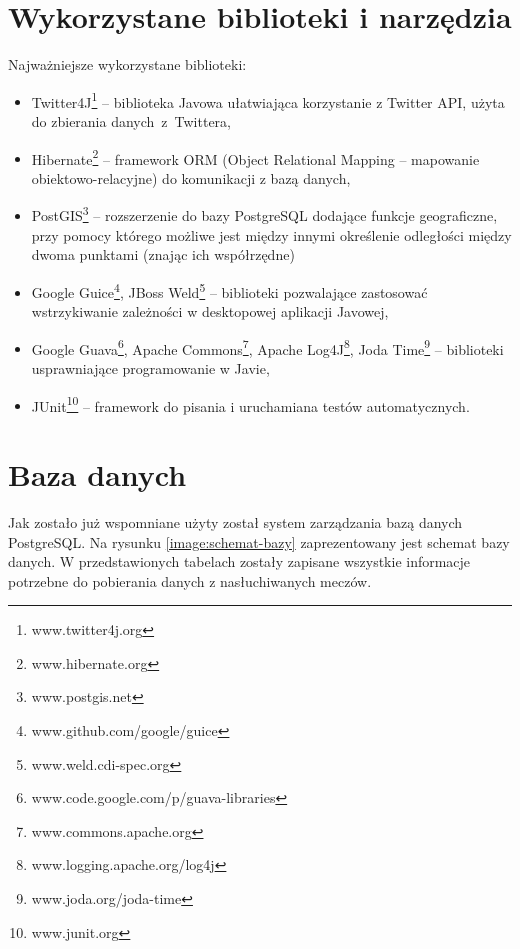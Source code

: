 \section{Wykorzystane biblioteki i narzędzia}
\label{section:bibliotekiinarzedzia}
Najważniejsze wykorzystane biblioteki:
\begin{itemize}
  \item Twitter4J\footnote{www.twitter4j.org} -- biblioteka Javowa ułatwiająca 
  korzystanie z Twitter API, użyta do zbierania \mbox{danych z Twittera,}
  
  \item Hibernate\footnote{www.hibernate.org} -- framework 
  ORM (Object Relational Mapping --  mapowanie obiektowo-relacyjne) do 
  komunikacji z bazą danych,
  
  \item PostGIS\footnote{www.postgis.net} -- rozszerzenie do bazy PostgreSQL
  dodające funkcje geograficzne, przy pomocy którego możliwe jest między
  innymi określenie odległości między dwoma punktami (znając ich współrzędne)
  
  
  
  \item Google Guice\footnote{www.github.com/google/guice}, 
  JBoss Weld\footnote{www.weld.cdi-spec.org} -- biblioteki pozwalające zastosować
  wstrzykiwanie zależności w desktopowej aplikacji Javowej,
  
  \item Google Guava\footnote{www.code.google.com/p/guava-libraries}, 
  Apache Commons\footnote{www.commons.apache.org}, 
  Apache Log4J\footnote{www.logging.apache.org/log4j}, 
  Joda Time\footnote{www.joda.org/joda-time} -- biblioteki
  usprawniające programowanie w Javie,
  
  \item JUnit\footnote{www.junit.org} -- framework do pisania i uruchamiana
  testów automatycznych.
\end{itemize}


\section{Baza danych}
Jak zostało już wspomniane użyty został system zarządzania bazą danych
PostgreSQL.
Na rysunku \ref{image:schemat-bazy} zaprezentowany jest schemat bazy danych. W
przedstawionych tabelach zostały zapisane wszystkie informacje potrzebne do
pobierania danych z nasłuchiwanych meczów.

